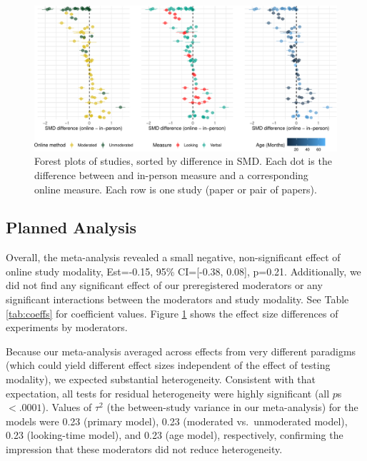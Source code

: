 \documentclass[
  man,floatsintext]{apa6}
\begin{document}
\begin{figure}[h]

{\centering \includegraphics[width=1\linewidth]{OnlineMA_main_files/figure-latex/forest-1} 

}

\caption{Forest plots of studies, sorted by difference in SMD. Each dot is the difference between and in-person measure and a corresponding online measure. Each row is one study (paper or pair of papers).}\label{fig:forest}
\end{figure}

\hypertarget{planned-analysis}{%
\subsection{Planned Analysis}\label{planned-analysis}}

Overall, the meta-analysis revealed a small negative, non-significant effect of online study modality, Est=-0.15, 95\% CI={[}-0.38, 0.08{]}, p=0.21. Additionally, we did not find any significant effect of our preregistered moderators or any significant interactions between the moderators and study modality. See Table \ref{tab:coeffs} for coefficient values. Figure \ref{fig:forest} shows the effect size differences of experiments by moderators.

Because our meta-analysis averaged across effects from very different paradigms (which could yield different effect sizes independent of the effect of testing modality), we expected substantial heterogeneity. Consistent with that expectation, all tests for residual heterogeneity were highly significant (all \(p\)s \(< .0001\)). Values of \(\tau^2\) (the between-study variance in our meta-analysis) for the models were 0.23 (primary model), 0.23 (moderated vs.~unmoderated model), 0.23 (looking-time model), and 0.23 (age model), respectively, confirming the impression that these moderators did not reduce heterogeneity.
\end{document}
